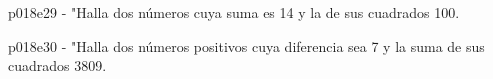 \documentclass[spanish, 11pt]{exam}
\begin{document}
\begin{questions}
\begin{multicols}{2}
        \end{multicols}
        \question p018e29 - "Halla dos números cuya suma es 14 y la de sus cuadrados 100.
        \begin{multicols}{2} 
        \end{multicols}
        \question p018e30 - "Halla dos números positivos cuya diferencia sea 7 y la suma de sus cuadrados 3809.
        \begin{multicols}{2} 
        \end{multicols}
        
    \end{questions}
    
\end{document}
